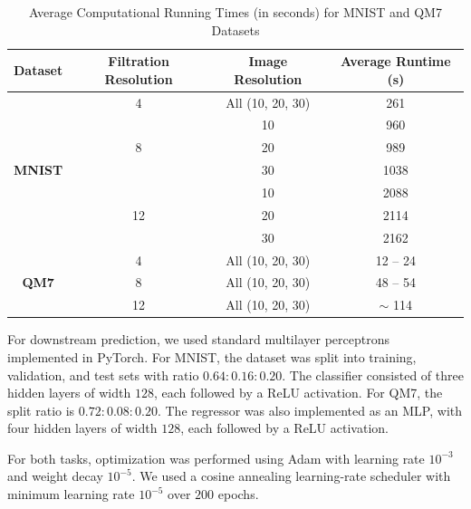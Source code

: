 \documentclass{article}
\begin{document}
\begin{table}[t]
\centering
\caption{Average Computational Running Times (in seconds) for MNIST and QM7 Datasets}
\label{tab:computation_runtimes}
\begin{tabular}{cccc}
\hline
\textbf{Dataset} & \textbf{Filtration Resolution} & \textbf{Image Resolution} & \textbf{Average Runtime (s)} \\ \hline
\multirow{7}{*}{\textbf{MNIST}} & 4 & All (10, 20, 30) & 261 \\ \cline{2-4} 
                                & \multirow{3}{*}{8} & 10 & 960 \\
                                &                    & 20 & 989 \\
                                &                    & 30 & 1038 \\ \cline{2-4} 
                                & \multirow{3}{*}{12} & 10 & 2088 \\
                                &                    & 20 & 2114 \\
                                &                    & 30 & 2162 \\ \hline
\multirow{3}{*}{\textbf{QM7}}   & 4                  & All (10, 20, 30) & 12 -- 24 \\
                                & 8                  & All (10, 20, 30) & 48 -- 54 \\
                                & 12                 & All (10, 20, 30) & $\sim$ 114 \\ \hline
\end{tabular}
\end{table}

For downstream prediction, we used standard multilayer perceptrons implemented in PyTorch. For MNIST, the dataset was split into training, validation, and test sets with ratio $0.64:0.16:0.20$. The classifier consisted of three hidden layers of width $128$, each followed by a ReLU activation. For QM7, the split ratio is $0.72:0.08:0.20$. The regressor was also implemented as an MLP, with four hidden layers of width $128$, each followed by a ReLU activation.

For both tasks, optimization was performed using Adam with learning rate $10^{-3}$ and weight decay $10^{-5}$. We used a cosine annealing learning-rate scheduler with minimum learning rate $10^{-5}$ over $200$ epochs.

% 
\end{document}
